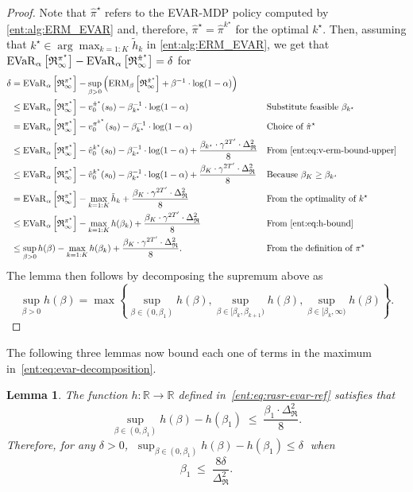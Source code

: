 \documentclass[twoside]{article}
\newcommand{\opt}{^\star}
\newcommand{\vspan}{\Delta_{\mathfrak{R}}}
\newcommand{\erm}[2]{\operatorname{ERM}_{#1}\left[#2\right]}
\newcommand{\evar}[2]{\operatorname{EVaR}_{#1} \left[#2\right]}
\newcommand{\Real}{\mathbb{R}}
\theoremstyle{plain}
\newtheorem{lemma}[theorem]{Lemma}
\theoremstyle{definition}
\theoremstyle{remark}
\begin{document}
\begin{proof}
Note that $\hat{\pi}\opt$ refers to the EVAR-MDP policy computed by \cref{ent:alg:ERM_EVAR} and, therefore, $\hat{\pi}\opt = \hat{\pi}^{k\opt}$ for the optimal $k\opt$. Then, assuming that $k\opt \in \arg\max_{k=1{:}K} \tilde{h}_k$ in \cref{ent:alg:ERM_EVAR}, we get that $\evar{\alpha}{\mathfrak{R}_{\infty}^{\pi\opt}} - \evar{\alpha}{\mathfrak{R}_{\infty}^{\api}} = \delta$ for 
\begin{align*}
  \delta &= 
    \evar{\alpha}{\mathfrak{R}_{\infty}^{\pi\opt}} -  \sup_{\beta > 0} \left( \erm{\beta}{\mathfrak{R}_{\infty}^{\api}} + \beta^{-1} \cdot \log(1-\alpha) \right) \\ 
    &\le \evar{\alpha}{\mathfrak{R}_{\infty}^{\pi\opt}} -   v_0^{\api}(s_0) - \beta_{k\opt}^{-1} \cdot \log(1-\alpha) && \text{Substitute feasible } \beta_{k\opt}\\ 
    &= \evar{\alpha}{\mathfrak{R}_{\infty}^{\pi\opt}} -  v_0^{\pi^{k\opt}}(s_0) - \beta_{k\opt}^{-1} \cdot \log(1-\alpha) && \text{Choice of } \api \\ 
    &\le \evar{\alpha}{\mathfrak{R}_{\infty}^{\pi\opt}} -   \hat{v}_0^{k\opt}(s_0) - \beta_{k\opt}^{-1} \cdot \log(1-\alpha) + \frac{\beta_{k\opt} \cdot \gamma^{2T'} \cdot \vspan^2}{8}  && \text{From~\eqref{ent:eq:v-erm-bound-upper}} \\
    &\le \evar{\alpha}{\mathfrak{R}_{\infty}^{\pi\opt}} -   \hat{v}_0^{k\opt}(s_0) - \beta_{k\opt}^{-1} \cdot \log(1-\alpha) + \frac{\beta_K \cdot \gamma^{2T'} \cdot \vspan^2}{8}  && \text{Because } \beta_K \ge \beta_{k\opt} \\
    &= \evar{\alpha}{\mathfrak{R}_{\infty}^{\pi\opt}} - \max_{k=1{:}K}  \tilde{h}_k+ \frac{\beta_K \cdot \gamma^{2T'} \cdot \vspan^2}{8} && \text{From the optimality of } k\opt \\
    &\le \evar{\alpha}{\mathfrak{R}_{\infty}^{\pi\opt}} - \max_{k=1{:}K}  h(\beta_k) + \frac{\beta_K \cdot \gamma^{2T'} \cdot \vspan^2}{8} && \text{From~\eqref{ent:eq:h-bound}}  \\
    &\le \sup_{\beta>0} h(\beta) - \max_{k=1{:}K}  h(\beta_k) + \frac{\beta_K \cdot \gamma^{2T'} \cdot \vspan^2}{8}.  && \text{From the definition of } \pi\opt 
\end{align*}
The lemma then follows by decomposing the supremum above as
  \[
   \sup_{\beta >0} h(\beta) = \max \left\{ \sup_{\beta\in (0,\beta_1)} h(\beta), \sup_{\beta \in [\beta_k,\beta_{k+1})} h(\beta), \sup_{\beta\in [\beta_k, \infty)} h(\beta) \right\}.
  \]
\end{proof}

The following three lemmas now bound each one of terms in the maximum in~\eqref{ent:eq:evar-decomposition}.
\begin{lemma} \label{ent:lem:case1}
The function $h\colon \Real \to \Real$  defined in~\eqref{ent:eq:rasr-evar-ref} satisfies that
  \[
    \sup_{\beta\in (0,\beta_1)} h(\beta) - h(\beta_1) \;\le\; \frac{\beta_1 \cdot \vspan^2}{8}.
  \]
Therefore, for any $\delta >0$, $\;\sup_{\beta\in (0,\beta_1)} h(\beta) - h(\beta_1) \le \delta\;$ when
\[
    \beta_1 \;\le\; \frac{8\delta}{\vspan^2} .
\]
\end{lemma}
\end{document}
